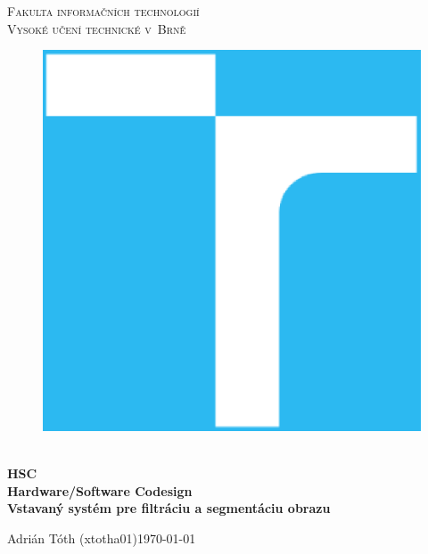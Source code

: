 \documentclass[11pt,a4paper]{article}
\begin{document}
\begin{titlepage}
    \begin{center}
        \Huge
        \textsc{
            Fakulta informačních technologií\\
            Vysoké učení technické v~Brně
        }
        \vspace{80px}
        \begin{figure}[!h]
            \centering
            \includegraphics[scale=0.3]{vutbr-fit-logo.eps}
        \end{figure}
        \\[15mm]
        \Huge{
            \textbf{
                HSC
            }
        }
        \\[1.5mm]
        \huge{
            \textbf{
                Hardware/Software Codesign
            }
        }
        \\[2.5em]
        \LARGE{
            \textbf{
                Vstavaný systém pre filtráciu a segmentáciu obrazu
            }
        }
        \vfill
    \end{center}
        \Large{
            Adrián Tóth (xtotha01)\hfill \today
        }
\end{titlepage}

\setlength{\parskip}{0pt}
\hypersetup{hidelinks}\tableofcontents
\setlength{\parskip}{0pt}
\end{document}
